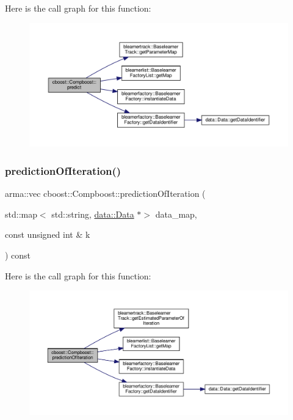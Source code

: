 Here is the call graph for this function\+:\nopagebreak
\begin{figure}[H]
\begin{center}
\leavevmode
\includegraphics[width=350pt]{classcboost_1_1_compboost_a1779a0c89cf9da32b250c0c083631c58_cgraph}
\end{center}
\end{figure}
\mbox{\label{classcboost_1_1_compboost_a6582a12bf1060750367219aeae395963}} 
\subsubsection{\texorpdfstring{prediction\+Of\+Iteration()}{predictionOfIteration()}}
{\footnotesize\ttfamily arma\+::vec cboost\+::\+Compboost\+::prediction\+Of\+Iteration (\begin{DoxyParamCaption}\item[{std\+::map$<$ std\+::string, \hyperlink{classdata_1_1_data}{data\+::\+Data} $\ast$$>$}]{data\+\_\+map,  }\item[{const unsigned int \&}]{k }\end{DoxyParamCaption}) const}

Here is the call graph for this function\+:\nopagebreak
\begin{figure}[H]
\begin{center}
\leavevmode
\includegraphics[width=350pt]{classcboost_1_1_compboost_a6582a12bf1060750367219aeae395963_cgraph}
\end{center}
\end{figure}
\mbox{\label{classcboost_1_1_compboost_ad1ee3b88f585f38255d827dceb4b7659}} 
